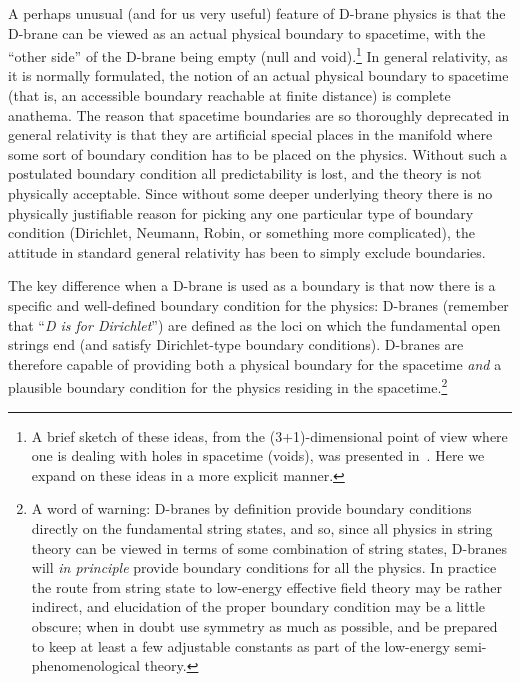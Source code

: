\documentclass[a4paper,12pt]{article}
\begin{document}
A perhaps unusual (and for us very useful) feature of D-brane physics
is that the D-brane can be viewed as an actual physical boundary to
spacetime, with the ``other side'' of the D-brane being empty (null and
void).\footnote{
A brief sketch of these ideas, from the (3+1)-dimensional point of
view where one is dealing with holes in spacetime (voids), was
presented in~\cite{Brane-surgery}. Here we expand on these ideas in a
more explicit manner.}
In general relativity, as it is normally formulated, the notion of an
actual physical boundary to spacetime (that is, an accessible boundary
reachable at finite distance) is complete anathema. The reason that
spacetime boundaries are so thoroughly deprecated in general
relativity is that they are artificial special places in the manifold
where some sort of boundary condition has to be placed on the
physics. Without such a postulated boundary condition all
predictability is lost, and the theory is not physically
acceptable. Since without some deeper underlying theory there is no
physically justifiable reason for picking any one particular type of
boundary condition (Dirichlet, Neumann, Robin, or something more
complicated), the attitude in standard general relativity has been to
simply exclude boundaries.

The key difference when a D-brane is used as a boundary is that now
there is a specific and well-defined boundary condition for the
physics: D-branes (remember that ``{\em D is for Dirichlet\/}'') are
defined as the loci on which the fundamental open strings end (and
satisfy Dirichlet-type boundary conditions). D-branes are therefore
capable of providing both a physical boundary for the spacetime {\em
and} a plausible boundary condition for the physics residing in the
spacetime.\footnote{
A word of warning: D-branes by definition provide boundary conditions
directly on the fundamental string states, and so, since all physics
in string theory can be viewed in terms of some combination of string
states, D-branes will {\em in principle} provide boundary conditions
for all the physics. In practice the route from string state to
low-energy effective field theory may be rather indirect, and
elucidation of the proper boundary condition may be a little obscure;
when in doubt use symmetry as much as possible, and be prepared to
keep at least a few adjustable constants as part of the low-energy
semi-phenomenological theory.}
\end{document}
